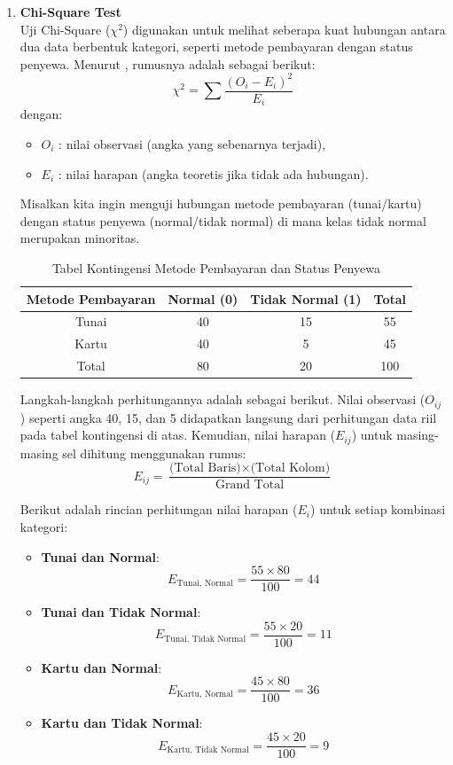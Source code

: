 \begin{enumerate}
    \item \textbf{Chi-Square Test} \\
    Uji Chi-Square ($\chi^2$) digunakan untuk melihat seberapa kuat hubungan antara dua data berbentuk kategori, seperti metode pembayaran dengan status penyewa. Menurut \cite{han2011data}, rumusnya adalah sebagai berikut:
    $$
    \chi^2 = \sum \frac{(O_i - E_i)^2}{E_i}
    $$
    dengan:
    \begin{itemize}
        \item $O_i$ : nilai observasi (angka yang sebenarnya terjadi),
        \item $E_i$ : nilai harapan (angka teoretis jika tidak ada hubungan).
    \end{itemize}

    Misalkan kita ingin menguji hubungan metode pembayaran (tunai/kartu) dengan status penyewa (normal/tidak normal) di mana kelas tidak normal merupakan minoritas.

    \begin{table}[H]
    \centering
    \caption{Tabel Kontingensi Metode Pembayaran dan Status Penyewa}
        \begin{tabular}{|c|c|c|c|}
            \hline
            \textbf{Metode Pembayaran} & \textbf{Normal (0)} & \textbf{Tidak Normal (1)} & \textbf{Total} \\
            \hline
            Tunai & 40 & 15 & 55 \\
            Kartu & 40 & 5 & 45 \\
            \hline
            Total & 80 & 20 & 100 \\
            \hline
        \end{tabular}
    \end{table}

    Langkah-langkah perhitungannya adalah sebagai berikut. Nilai observasi ($O_{ij}$) seperti angka 40, 15, dan 5 didapatkan langsung dari perhitungan data riil pada tabel kontingensi di atas. Kemudian, nilai harapan ($E_{ij}$) untuk masing-masing sel dihitung menggunakan rumus:
    $$
    E_{ij} = \frac{\text{(Total Baris)} \times \text{(Total Kolom)}}{\text{Grand Total}}
    $$
    
    Berikut adalah rincian perhitungan nilai harapan ($E_i$) untuk setiap kombinasi kategori:
    \begin{itemize}
        \item \textbf{Tunai dan Normal}:
        $$
        E_{\text{Tunai, Normal}} = \frac{55 \times 80}{100} = 44
        $$
        \item \textbf{Tunai dan Tidak Normal}:
        $$
        E_{\text{Tunai, Tidak Normal}} = \frac{55 \times 20}{100} = 11
        $$
        \item \textbf{Kartu dan Normal}:
        $$
        E_{\text{Kartu, Normal}} = \frac{45 \times 80}{100} = 36
        $$
        \item \textbf{Kartu dan Tidak Normal}:
        $$
        E_{\text{Kartu, Tidak Normal}} = \frac{45 \times 20}{100} = 9
        $$
    \end{itemize}


\end{enumerate}

